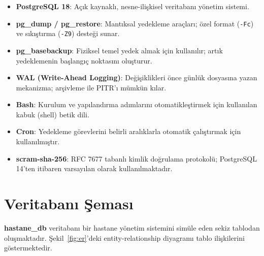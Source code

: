 \documentclass[12pt, a4paper]{report}
\begin{document}
\begin{itemize}
  \item \textbf{PostgreSQL 18}: Açık kaynaklı, nesne-ilişkisel veritabanı yönetim sistemi.
  \item \textbf{pg\_dump / pg\_restore}: Mantıksal yedekleme araçları; özel format (\texttt{-Fc}) ve sıkıştırma (\texttt{-Z9}) desteği sunar.
  \item \textbf{pg\_basebackup}: Fiziksel temel yedek almak için kullanılır; artık yedeklemenin başlangıç noktasını oluşturur.
  \item \textbf{WAL (Write-Ahead Logging)}: Değişiklikleri önce günlük dosyasına yazan mekanizma; arşivleme ile PITR'ı mümkün kılar.
  \item \textbf{Bash}: Kurulum ve yapılandırma adımlarını otomatikleştirmek için kullanılan kabuk (shell) betik dili.
  \item \textbf{Cron}: Yedekleme görevlerini belirli aralıklarla otomatik çalıştırmak için kullanılmıştır.
  \item \textbf{scram-sha-256}: RFC 7677 tabanlı kimlik doğrulama protokolü; PostgreSQL 14'ten itibaren varsayılan olarak kullanılmaktadır.
\end{itemize}

\newpage
\section{Veritabanı Şeması}

\textbf{hastane\_db} veritabanı bir hastane yönetim sistemini simüle eden sekiz tablodan oluşmaktadır. Şekil~\ref{fig:er}'deki entity-relationship diyagramı tablo ilişkilerini göstermektedir.

\end{document}
